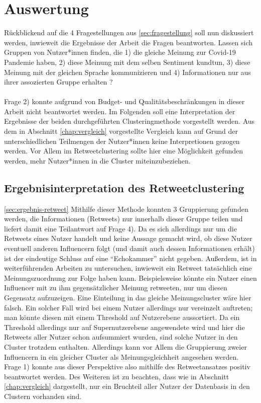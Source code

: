 \chapter{Auswertung}
\label{chap:auswertung}
Rückblickend auf die 4 Fragestellungen aus \ref{sec:fragestellung} soll nun diskussiert werden, inwieweit die Ergebnisse der Arbeit die Fragen beantworten. 
Lassen sich Gruppen von Nutzer*innen finden, die 1) die gleiche Meinung zur Covid-19 Pandemie haben, 2) diese Meinung mit dem selben Sentiment kundtun, 3) diese Meinung mit der gleichen Sprache kommunizieren und 4) Informationen nur aus ihrer assozierten Gruppe erhalten ? \\\\
Frage 2) konnte aufgrund von Budget- und Qualitätsbeschränkungen in dieser Arbeit nicht beantwortet werden.
Im Folgenden soll eine Interpretation der Ergebnisse der beiden durchgeführten Clusteringmethode vorgestellt werden.
Aus dem in Abschnitt \ref{chap:vergleich}  vorgestellte Vergleich kann auf Grund der unterschiedlichen Teilmengen der Nutzer*innen keine Interpretionen gezogen werden. Vor Allem im Retweetclustering sollte hier eine Möglichkeit gefunden werden, mehr Nutzer*innen in die Cluster miteinzubeziehen.
\section{Ergebnisinterpretation des Retweetclustering}
\ref{sec:ergebnis-retweet}
Mithilfe dieser Methode konnten 3 Gruppierung gefunden  werden, die Informationen (Retweets) nur innerhalb dieser Gruppe teilen und liefert damit eine Teilantwort auf Frage 4). Da es sich allerdings nur um die Retweets eines Nutzer handelt  und keine Aussage gemacht wird, ob diese Nutzer eventuell anderen Influencern folgt (und damit auch dessen Informationen erhält) ist der eindeutige Schluss auf eine "`Echokammer"' nicht gegeben.
Außerdem, ist in weiterführenden Arbeiten zu untersuchen, inwieweit ein Retweet tatsächlich eine Meinungszuordnung zur Folge haben kann.
Beispielsweise könnte ein Nutzer einen Influencer mit zu ihm gegensätzlicher Meinung retweeten, nur um diesen Gegensatz aufzuzeigen. Eine Einteilung in das gleiche Meinungscluster wäre hier falsch.
Ein solcher Fall wird bei einem Nutzer allerdings nur vereinzelt auftreten; man könnte diesen mit einem Threshold auf Nutzerebene aussortiert. Da ein Threshold allerdings nur auf Supernutzerebene angewendete wird und hier die Retweets aller Nutzer schon aufsummiert wurden, sind solche Nutzer in den Cluster trotzdem enthalten. 
Allerdings kann vor Allem die Gruppierung zweier Influencern in ein gleicher Cluster als Meinungsgleichheit angesehen werden. Frage 1) konnte aus dieser Perspektive also mithilfe des Retweetansatzes positiv beantwortet werden.
Des Weiteren ist zu beachten, dass wie in Abschnitt \ref{chap:vergleich} dargestellt, nur ein Bruchteil aller Nutzer der Datenbasis in den Clustern vorhanden sind.
